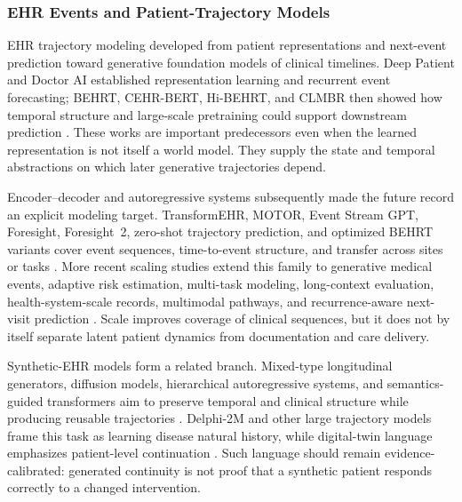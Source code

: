 \subsubsection{EHR Events and Patient-Trajectory Models}

EHR trajectory modeling developed from patient representations and next-event prediction toward generative foundation models of clinical timelines. Deep Patient and Doctor AI established representation learning and recurrent event forecasting; BEHRT, CEHR-BERT, Hi-BEHRT, and CLMBR then showed how temporal structure and large-scale pretraining could support downstream prediction \citep{Miotto2016DeepPatientUnsupervised,Choi2016DoctorAiPredicting,Li2020BEHRTTransformerElectronic,Pang2021CehrBertIncorporating,Li2021HiBehrtHierarchical,Steinberg2021LanguageModelsAre}. These works are important predecessors even when the learned representation is not itself a world model. They supply the state and temporal abstractions on which later generative trajectories depend.

Encoder--decoder and autoregressive systems subsequently made the future record an explicit modeling target. TransformEHR, MOTOR, Event Stream GPT, Foresight, Foresight~2, zero-shot trajectory prediction, and optimized BEHRT variants cover event sequences, time-to-event structure, and transfer across sites or tasks \citep{Yang2023TransformEHRtransformerbased,Steinberg2023MOTORTimeEvent,McDermott2023EventStreamGpt,Kraljevi_2024Foresightgenerativepretrained,Renc2024ZeroShotHealth,Odgaard2024CoreBehrtCarefully,Kraljevic2024LargeLanguageModels,Guo2024multicenterstudy}. More recent scaling studies extend this family to generative medical events, adaptive risk estimation, multi-task modeling, long-context evaluation, health-system-scale records, multimodal pathways, and recurrence-aware next-visit prediction \citep{Waxler2025GenerativeMedicalEvent,Renc2025Foundationmodelelectronic,Redekop2025Zeroshotmedical,Pang2025CEHRXGPTScalable,Kim2025MultimodalElectronicHealth,Wornow2025ContextCluesEvaluating,Rajamohan2025FoundationModelsClinical,Pellegrini2025Ehr2pathScalableModeling,Rajamohan2026ScalingRecurrenceAware}. Scale improves coverage of clinical sequences, but it does not by itself separate latent patient dynamics from documentation and care delivery.

Synthetic-EHR models form a related branch. Mixed-type longitudinal generators, diffusion models, hierarchical autoregressive systems, and semantics-guided transformers aim to preserve temporal and clinical structure while producing reusable trajectories \citep{Li2023Generatingsyntheticmixed,Kuo2023SyntheticHealthrelated,Theodorou2023SynthesizeHighDimensional,Zhou2025GeneratingClinicallyRealistic}. Delphi-2M and other large trajectory models frame this task as learning disease natural history, while digital-twin language emphasizes patient-level continuation \citep{Makarov2025Largelanguagemodels,Shmatko2025Delphi2M}. Such language should remain evidence-calibrated: generated continuity is not proof that a synthetic patient responds correctly to a changed intervention.

